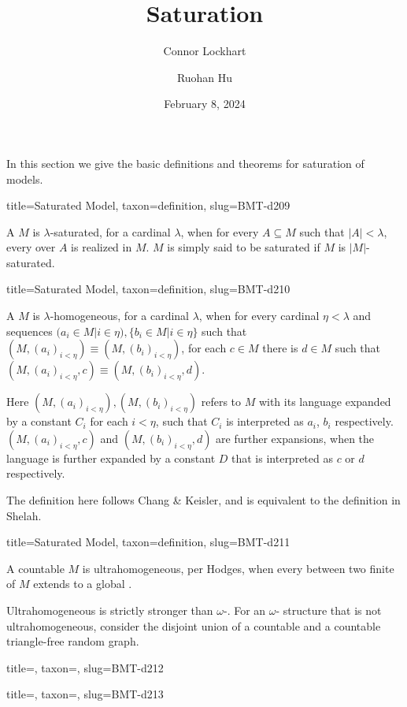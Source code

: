 \documentclass[a4paper]{article}
\title{Saturation}
\date{February 8, 2024}
\author{Connor Lockhart \and Ruohan Hu}
\begin{document}
\maketitle
\par{In this section we give the basic definitions and theorems for saturation of models.}
\begin{tree}{title={Saturated Model}, taxon={definition}, slug={BMT-d209}}

    A  \(M\) is \(\lambda\)-saturated, for a cardinal \(\lambda\), when for every \(A \subseteq  M\) such that \(|A|< \lambda\), every  over \(A\) is realized in \(M\). \(M\) is simply said to be saturated if \(M\) is \(|M|\)-saturated.

\end{tree}

\begin{tree}{title={Saturated Model}, taxon={definition}, slug={BMT-d210}}

    A  \(M\) is \(\lambda\)-homogeneous, for a cardinal \(\lambda\), 
    when for every cardinal \(\eta < \lambda\) and sequences \((a_i \in  M|i \in \eta ), \{ b_i \in  M|i \in \eta \}\) such that \((M,(a_i)_{i< \eta }) \equiv (M,(b_i)_{i< \eta })\), 
    for each \(c \in  M\) there is \(d \in  M\) such that \((M,(a_i)_{i< \eta },c) \equiv (M,(b_i)_{i< \eta },d)\). 

    Here \((M,(a_i)_{i< \eta }),(M,(b_i)_{i< \eta })\) refers to \(M\) with its language expanded by a constant \(C_i\) for each \(i< \eta\), such that \(C_i\) is interpreted as \(a_i\), \(b_i\) respectively. 
    \((M,(a_i)_{i< \eta },c)\) and \((M,(b_i)_{i< \eta },d)\) are further expansions, when the language is further expanded by a constant \(D\) that is interpreted as \(c\) or \(d\) respectively.

    The definition here follows Chang & Keisler, and is equivalent to the definition in Shelah.

\end{tree}

\begin{tree}{title={Saturated Model}, taxon={definition}, slug={BMT-d211}}

    A countable  \(M\) is ultrahomogeneous, per Hodges, when every  between two finite  of \(M\) extends to a global .

    Ultrahomogeneous is strictly stronger than \(\omega\)-. For an \(\omega\)- structure that is not ultrahomogeneous, consider the disjoint union of a countable  and a countable triangle-free random graph.

\end{tree}

\begin{tree}{title={}, taxon={}, slug={BMT-d212}}

\end{tree}

\begin{tree}{title={}, taxon={}, slug={BMT-d213}}

\end{tree}

\printbibliography
\end{document}

